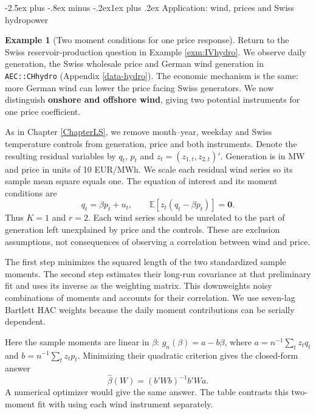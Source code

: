 \documentclass[
  11pt,
]{book}
\makeatletter
\renewcommand\subsection{\@startsection{subsection}{2}{\z@}
  {-2.5ex plus -.8ex minus -.2ex}{1ex plus .2ex}
  {\normalfont\large\bfseries\color{TextbookInk}}}
\theoremstyle{definition}
\theoremstyle{definition}
\newtheorem{example}{Example}[chapter]
\theoremstyle{definition}
\theoremstyle{definition}
\theoremstyle{remark}
\makeatother
\begin{document}
\subsection{Application: wind, prices and Swiss hydropower}\label{application-wind-prices-and-swiss-hydropower}

\begin{example}[Two moment conditions for one price response]
\protect\hypertarget{exm:gmm-hydro}{}\label{exm:gmm-hydro}Return to the Swiss reservoir-production question in Example \ref{exm:IVhydro}. We observe daily generation, the Swiss wholesale price and German wind generation in \texttt{AEC::CHhydro} (Appendix \ref{data-hydro}). The economic mechanism is the same: more German wind can lower the price facing Swiss generators. We now distinguish \textbf{onshore and offshore wind}, giving two potential instruments for one price coefficient.

As in Chapter \ref{ChapterLS}, we remove month--year, weekday and Swiss temperature controls from generation, price and both instruments. Denote the resulting residual variables by \(q_t\), \(p_t\) and \(z_t=(z_{1,t},z_{2,t})'\). Generation is in MW and price in units of 10 EUR/MWh. We scale each residual wind series so its sample mean square equals one. The equation of interest and its moment conditions are
\[
q_t=\beta p_t+u_t,\qquad
\mathbb{E}\left[z_t(q_t-\beta p_t)\right]=\mathbf{0}.
\]
Thus \(K=1\) and \(r=2\). Each wind series should be unrelated to the part of generation left unexplained by price and the controls. These are exclusion assumptions, not consequences of observing a correlation between wind and price.

The first step minimizes the squared length of the two standardized sample moments. The second step estimates their long-run covariance at that preliminary fit and uses its inverse as the weighting matrix. This downweights noisy combinations of moments and accounts for their correlation. We use seven-lag Bartlett HAC weights because the daily moment contributions can be serially dependent.

Here the sample moments are linear in \(\beta\): \(g_n(\beta)=a-b\beta\), where \(a=n^{-1}\sum_tz_tq_t\) and \(b=n^{-1}\sum_tz_tp_t\). Minimizing their quadratic criterion gives the closed-form answer
\[
\widehat\beta(W)=(b'Wb)^{-1}b'Wa.
\]
A numerical optimizer would give the same answer. The table contrasts this two-moment fit with using each wind instrument separately.

\begin{table}[H]
\centering\begingroup\fontsize{10}{12}\selectfont


\end{table}
\end{example}
\end{document}
